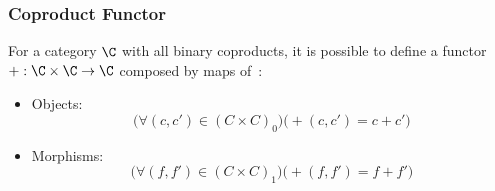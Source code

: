 \subsubsection{Coproduct Functor}
  \begin{definition}
    For a category $\C$ with all binary coproducts, it is possible to define a
    functor $+:\C\times \C \to \C$ composed by maps
    of~\parencite[p.~61]{awodey:category_theory}:
    \begin{itemize}
      \item Objects:
        \[\big(\forall (c,c')\in (C\times C)_0\big)
          \big(+(c, c') = c+ c'\big)\]
      \item Morphisms:
        \[\big(\forall (f, f')\in (C\times C)_1\big)
          \big(+(f, f') = f+ f'\big)\]
    \end{itemize}
  \end{definition}

